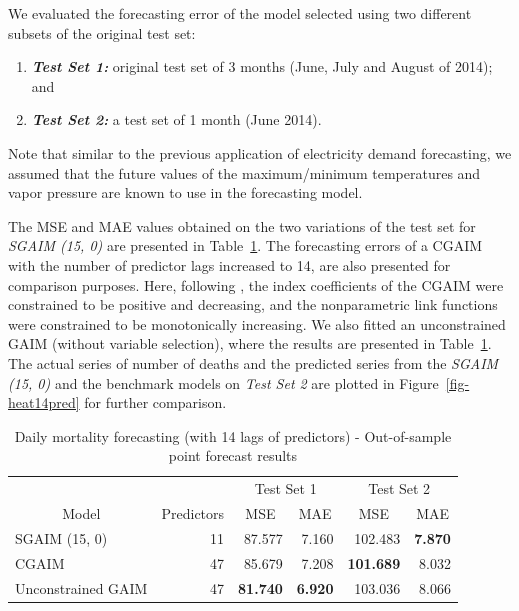 \documentclass[11pt,a4paper,]{article}
\providecommand{\tightlist}{%
  \setlength{\itemsep}{0pt}\setlength{\parskip}{0pt}}
\begin{document}
We evaluated the forecasting error of the model selected using two
different subsets of the original test set:

\begin{enumerate}
\def\labelenumi{\arabic{enumi}.}
\tightlist
\item
  \textbf{\emph{Test Set 1:}} original test set of 3 months (June, July
  and August of 2014); and
\item
  \textbf{\emph{Test Set 2:}} a test set of 1 month (June 2014).
\end{enumerate}

Note that similar to the previous application of electricity demand
forecasting, we assumed that the future values of the maximum/minimum
temperatures and vapor pressure are known to use in the forecasting
model.

The MSE and MAE values obtained on the two variations of the test set
for \emph{SGAIM (15, 0)} are presented in Table~\ref{tbl-heat1}. The
forecasting errors of a CGAIM with the number of predictor lags
increased to 14, are also presented for comparison purposes. Here,
following \textcite{Masselot2022}, the index coefficients of the CGAIM
were constrained to be positive and decreasing, and the nonparametric
link functions were constrained to be monotonically increasing. We also
fitted an unconstrained GAIM (without variable selection), where the
results are presented in Table~\ref{tbl-heat1}. The actual series of
number of deaths and the predicted series from the \emph{SGAIM (15, 0)}
and the benchmark models on \emph{Test Set 2} are plotted in
Figure~\ref{fig-heat14pred} for further comparison.

\hypertarget{tbl-heat1}{}
\begin{table}[!h]
\caption{\label{tbl-heat1}Daily mortality forecasting (with 14 lags of predictors) - Out-of-sample
point forecast results }\tabularnewline

\centering
\begin{tabular}{lr>{}r>{}r>{}r>{}r}
\toprule
\multicolumn{1}{c}{} & \multicolumn{1}{c}{} & \multicolumn{2}{c}{Test Set 1} & \multicolumn{2}{c}{Test Set 2} \\
\cmidrule(l{3pt}r{3pt}){3-4} \cmidrule(l{3pt}r{3pt}){5-6}
\multicolumn{1}{c}{Model} & \multicolumn{1}{c}{Predictors} & \multicolumn{1}{c}{MSE} & \multicolumn{1}{c}{MAE} & \multicolumn{1}{c}{MSE} & \multicolumn{1}{c}{MAE}\\
\midrule
SGAIM (15, 0) & 11 & 87.577 & 7.160 & 102.483 & \textbf{7.870}\\
CGAIM & 47 & 85.679 & 7.208 & \textbf{101.689} & 8.032\\
Unconstrained GAIM & 47 & \textbf{81.740} & \textbf{6.920} & 103.036 & 8.066\\
\bottomrule
\end{tabular}
\end{table}
\end{document}
